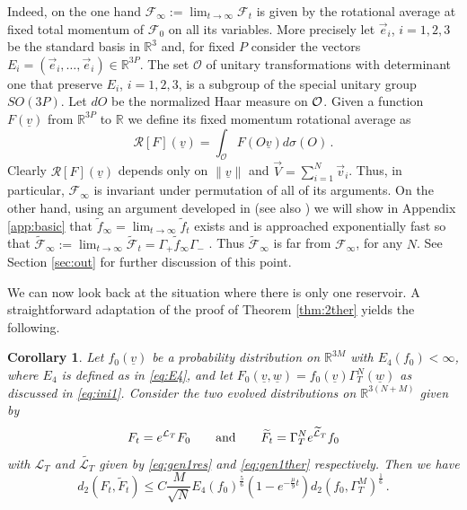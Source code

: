 \documentclass{article}
\newcommand{\underconstruction}{\marginpar{\bcpanchant}}
\newcommand{\scrF}{{\mathscr F}}
\newcommand \ul[1]{\underline{#1}}
\renewcommand\v[1]{\vec{#1}}
\newcommand*\R{ \mathds{R} }
\newtheorem{corollary}[mythm]{Corollary}
\begin{document}
Indeed, on the one hand $\scrF_\infty:=\lim_{t\to\infty}\scrF_t$ is given by the rotational average at fixed total
momentum of $\scrF_0$ on all its variables. More precisely let $\vec e_i$, $i=1,2,3$ be the standard basis in $\R^3$
and, for fixed $P$ consider the vectors $E_i=(\v e_i,\ldots,\v e_i)\in\R^{3P}$. The set $\mathcal O$ of unitary
transformations with determinant one that preserve $E_i$, $i=1,2,3$, is a subgroup of the special  unitary group
$SO(3P)$. Let $d O$ be the normalized Haar measure on $\cal O$. Given a function $F(\ul v)$ from $\R^{3P}$ to $\R$ we
define its fixed momentum rotational average as
\begin{equation}\label{def:rotav}
	\mathcal R[F](\ul v)=\int_{\mathcal O} F(O\ul v)d\sigma(O)\, .
\end{equation}
Clearly $\mathcal R[F](\ul v)$ depends only on $\|\ul v\|$ and $\v V=\sum_{i=1}^N \vec v_i$. Thus, in particular,
$\scrF_\infty$ is invariant under permutation of all of its arguments. On the other hand, using an argument developed in \cite{CLM,Evans} (see also \cite{CELMM18}) we will show in Appendix \ref{app:basic}
that $\tilde f_\infty=\lim_{t\to\infty}\tilde f_t$ exists and is approached exponentially fast so that $\widetilde
\scrF_\infty:=\lim_{t\to\infty}\widetilde\scrF_t=\Gamma_+\tilde f_\infty\Gamma_-$ . Thus $\widetilde \scrF_\infty$ is far
from $\scrF_\infty$, for any $N$. See Section \ref{sec:out} for further discussion of this point.

We can now look back at the situation where there is only one reservoir. A straightforward adaptation of the proof of 
Theorem \ref{thm:2ther} yields the following.

\begin{corollary} \label{thm:1ther} Let $f_0(\underline v)$ be a probability distribution on $\mathds
R^{3M}$ with $E_4(f_0)<\infty$, where $E_4$ is defined as in \eqref{eq:E4}, and let $F_0(\underline v,\underline w)=f_0(\underline
v)\Gamma_T^N(\underline w)$ as discussed in \eqref{eq:ini1}. Consider the two evolved distributions on $\mathds 
R^{3(N+M)}$ given by
\[
F_t=e^{\mathcal L_T}F_0\qquad\hbox{and}\qquad
\widetilde F_t=\Gamma_T^N e^{\widetilde{\mathcal L}_T}f_0
\]
with $\mathcal L_T$ and $\widetilde{\mathcal L_T}$ given by \eqref{eq:gen1res} and \eqref{eq:gen1ther} respectively.
Then we have%
\begin{equation}\label{eq:stima1}
d_2(F_t,\widetilde F_t)\leq 
C\frac{M}{\sqrt
N}E_4(f_0)^{\frac56}(1-e^{-\frac\mu9t})d_2(f_0,\Gamma_T^M)^{\frac16}\, .
\end{equation}
\end{corollary}
\end{document}
